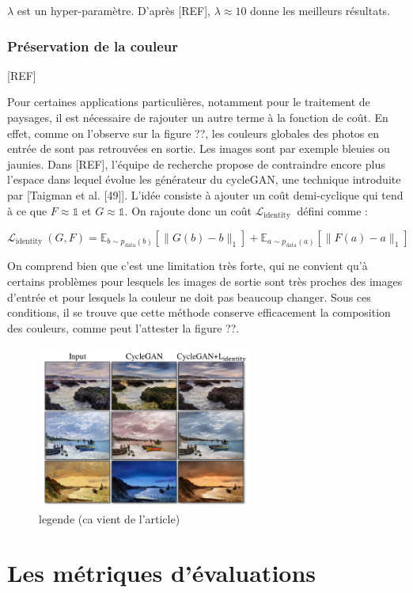 $\lambda$ est un hyper-paramètre. D'après [REF], $\lambda \approx 10$ donne les meilleurs résultats.

\subsubsection{Préservation de la couleur}

[REF]

Pour certaines applications particulières, notamment pour le traitement de paysages, il est nécessaire de rajouter un autre terme à la fonction de coût. En effet, comme on l'observe sur la figure ??, les couleurs globales des photos en entrée de sont pas retrouvées en sortie. Les images sont par exemple bleuies ou  jaunies. Dans [REF], l'équipe de recherche propose de contraindre encore plus l'espace dans lequel évolue les générateur du cycleGAN, une technique introduite par [Taigman et al. [49]]. L'idée consiste à ajouter un coût demi-cyclique qui tend à ce que $ F \approx \mathbb{1} $ et $ G \approx \mathbb{1} $. On rajoute donc un coût $\mathcal{L}_{\text {identity }}$ défini comme :

$$\mathcal{L}_{\text {identity }}(G, F)=\mathbb{E}_{b \sim p_{\text {data}}(b)}\left[\|G(b)-b\|_{1}\right]+ \mathbb{E}_{a \sim p_{\text {data}}(a)}\left[\|F(a)-a\|_{1}\right]$$

On comprend bien que c'est une limitation très forte, qui ne convient qu'à certains problèmes pour lesquels les images de sortie sont très proches des images d'entrée et pour lesquels la couleur ne doit pas beaucoup changer. Sous ces conditions, il se trouve que cette méthode conserve efficacement la composition des couleurs, comme peut l'attester la figure ??. 

\begin{figure}[!h]
\centering
\includegraphics[width=200pt]{"images/Lident"}
\caption{legende (ca vient de l'article)}
\end{figure}


\section{Les métriques d'évaluations}

